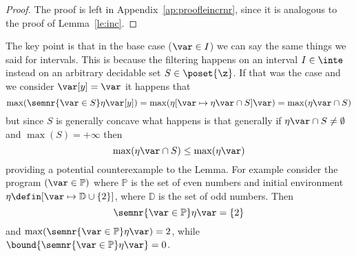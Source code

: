\begin{proof}
  The proof is left in Appendix~\ref{ap:proofleincrnr}, since it is
  analogous to the proof of Lemma~\ref{le:inc}.
\end{proof}

\begin{remark}
    The key point is that in the base case
  (\(\var\in I\)) we can say the same things we said for
  intervals. This is because the filtering happens on an interval
  \(I \in \inte\) instead on an arbitrary decidable set
  \(S \in \poset{\z}\). If that was the case and we consider
  \(\var[y] = \var\) it happens that
  \begin{equation}
    \max(\semnr{\var\in S}\eta\var[y]) = \max(\eta[\var \mapsto \eta\var \cap S]\var) = \max(\eta\var \cap S)
  \end{equation}
  but since \(S\) is generally concave what happens is that generally
  if \(\eta \var \cap S \neq \emptyset\) and \(\max(S) = +\infty\) then
  \begin{equation}
    \max(\eta\var \cap S) \leq \max(\eta\var)
  \end{equation}
  providing a potential counterexample to the Lemma. For example
  consider the program \((\var\in\mathbb{P})\)
  where \(\mathbb{P}\) is the set of even numbers and initial
  environment \({\eta \defin [\var\mapsto \mathbb{D} \cup \{2\}]}\),
  where \(\mathbb{D}\) is the set of odd numbers. Then
  \begin{equation*}
    {\semnr{\var\in\mathbb{P}}\eta\var} = \{2\}
  \end{equation*}
  and \(\max({\semnr{\var\in\mathbb{P}}\eta\var}) = 2\), while
  \(\bound{\semnr{\var\in\mathbb{P}}\eta\var} = 0\).

  \medskip


\end{remark}
